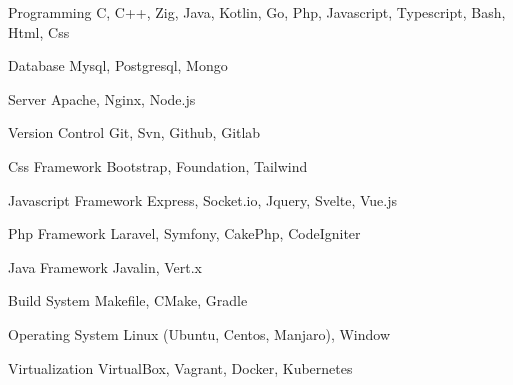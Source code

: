 

\begin{cvskills}

  \cvskill
    {Programming} %
    {C, C++, Zig, Java, Kotlin, Go, Php, Javascript, Typescript, Bash, Html, Css} %

  \cvskill
    {Database} %
    {Mysql, Postgresql, Mongo} %
    
  \cvskill
    {Server} %
    {Apache, Nginx, Node.js} %
    
  \cvskill
    {Version Control} %
    {Git, Svn, Github, Gitlab} %
    
  \cvskill
    {Css Framework} %
    {Bootstrap, Foundation, Tailwind} %
    
  \cvskill
    {Javascript Framework} %
    {Express, Socket.io, Jquery, Svelte, Vue.js} %

  \cvskill
    {Php Framework} %
    {Laravel, Symfony, CakePhp, CodeIgniter} %
    
  \cvskill
    {Java Framework} %
    {Javalin, Vert.x} %
    
  \cvskill
    {Build System} %
    {Makefile, CMake, Gradle} %
    
  \cvskill
    {Operating System} %
    {Linux (Ubuntu, Centos, Manjaro), Window} %
    
  \cvskill
    {Virtualization} %
    {VirtualBox, Vagrant, Docker, Kubernetes} %
    

\end{cvskills}
